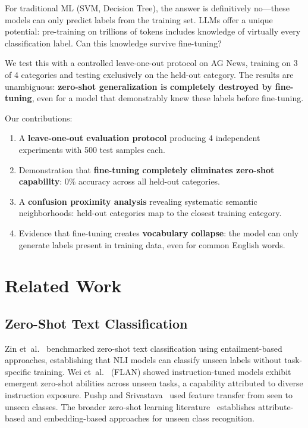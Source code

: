 \documentclass[journal]{IEEEtran}
\begin{document}
For traditional ML (SVM, Decision Tree), the answer is definitively no---these models can only predict labels from the training set. LLMs offer a unique potential: pre-training on trillions of tokens includes knowledge of virtually every classification label. Can this knowledge survive fine-tuning?

We test this with a controlled leave-one-out protocol on AG News, training on 3 of 4 categories and testing exclusively on the held-out category. The results are unambiguous: \textbf{zero-shot generalization is completely destroyed by fine-tuning}, even for a model that demonstrably knew these labels before fine-tuning.

Our contributions:
\begin{enumerate}
\item A \textbf{leave-one-out evaluation protocol} producing 4 independent experiments with 500 test samples each.
\item Demonstration that \textbf{fine-tuning completely eliminates zero-shot capability}: 0\% accuracy across all held-out categories.
\item A \textbf{confusion proximity analysis} revealing systematic semantic neighborhoods: held-out categories map to the closest training category.
\item Evidence that fine-tuning creates \textbf{vocabulary collapse}: the model can only generate labels present in training data, even for common English words.
\end{enumerate}

\section{Related Work}

\subsection{Zero-Shot Text Classification}
Zin et~al.~\cite{yin2019} benchmarked zero-shot text classification using entailment-based approaches, establishing that NLI models can classify unseen labels without task-specific training. Wei et~al.~\cite{wei2022} (FLAN) showed instruction-tuned models exhibit emergent zero-shot abilities across unseen tasks, a capability attributed to diverse instruction exposure. Pushp and Srivastava~\cite{pushp2017} used feature transfer from seen to unseen classes. The broader zero-shot learning literature~\cite{lampert2014,romera2015,wang2019,xian2019} establishes attribute-based and embedding-based approaches for unseen class recognition.
\end{document}
